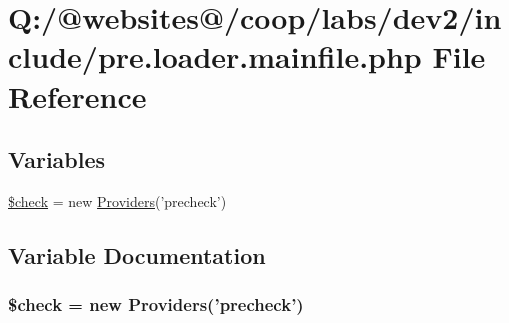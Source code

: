 \hypertarget{pre_8loader_8mainfile_8php}{\section{Q\-:/@websites@/coop/labs/dev2/include/pre.loader.\-mainfile.\-php File Reference}
\label{pre_8loader_8mainfile_8php}
}
\subsection*{Variables}
\begin{DoxyCompactItemize}
\item 
\hyperlink{pre_8loader_8mainfile_8php_a830cf70d25fefacddcf4c6bc3fd7a0e0}{\$check} = new \hyperlink{class_providers}{Providers}('precheck')
\end{DoxyCompactItemize}


\subsection{Variable Documentation}
\hypertarget{pre_8loader_8mainfile_8php_a830cf70d25fefacddcf4c6bc3fd7a0e0}{
\subsubsection[{\$check}]{\setlength{\rightskip}{0pt plus 5cm}\$check = new {\bf Providers}('precheck')}}\label{pre_8loader_8mainfile_8php_a830cf70d25fefacddcf4c6bc3fd7a0e0}
